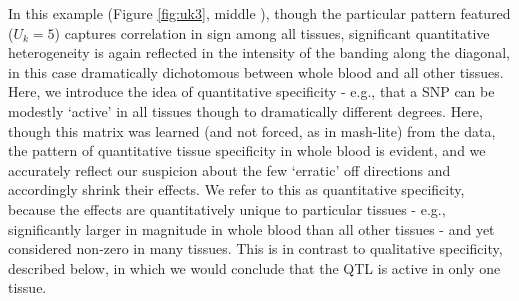 %


In this example (Figure \ref{fig:uk3}, middle ), though the particular pattern featured ($U_{k}=5$) captures correlation in sign among all tissues, significant quantitative heterogeneity is again reflected in the intensity of the banding along the diagonal, in this case dramatically dichotomous between whole blood and all other tissues. Here, we introduce the idea of quantitative specificity - e.g., that a SNP can be modestly `active' in all tissues though to dramatically different degrees. Here, though this matrix was learned (and not forced, as in mash-lite) from the data, the pattern of quantitative tissue specificity in %
whole blood is evident, and we accurately reflect our suspicion about the few `erratic' off directions and accordingly shrink their effects. %
We refer to this as quantitative specificity, because the effects are quantitatively unique to particular tissues - e.g., significantly larger in magnitude in whole blood than all other tissues - and yet considered non-zero in many tissues. This is in contrast to qualitative specificity, described below, in which we would conclude that the QTL is active in only one tissue. \newline





